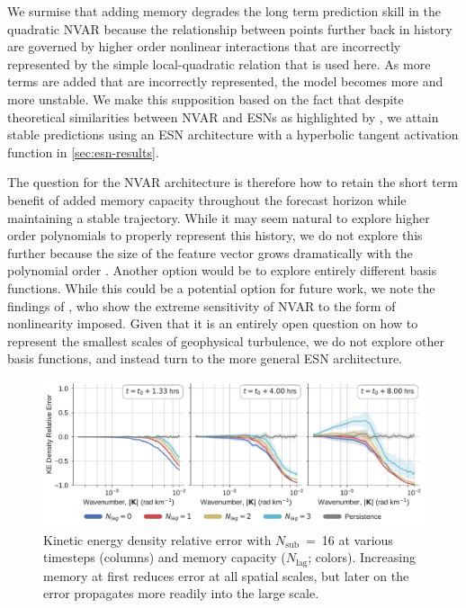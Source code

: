 \documentclass[draft]{agujournal2019}
\newcommand{\maxlag}{N_\text{lag}}
\newcommand{\nsub}{N_\text{sub}}
\newcommand{\nlag}{\maxlag}
\newcommand{\citep}{\cite}
\newcommand{\citet}{\citeA}
\begin{document}
We surmise that adding memory degrades the long term prediction skill in the
quadratic NVAR because
the relationship between points further back in history are governed by higher
order nonlinear interactions that are incorrectly represented by
the simple local-quadratic relation that is used here.
As more terms are added that are incorrectly represented, the model becomes
more and more unstable.
We make this supposition based on the fact that despite
theoretical similarities between NVAR and
ESNs as highlighted by \citet{bollt_explaining_2021}, we attain stable
predictions using an ESN architecture with a hyperbolic tangent activation
function in \cref{sec:esn-results}.

The question for the NVAR architecture
is therefore how to retain the short term benefit of added memory
capacity throughout the forecast horizon while maintaining a stable trajectory.
While it may seem natural to explore higher order polynomials to
properly represent this history, we do not explore this further because the size
of the feature vector grows dramatically with the polynomial order
\citep{chen_next_2022}.
Another option would be to explore entirely different basis functions.
While this could be a potential option for future work, we note the findings of
\citet{zhang_catch-22_2022}, who show the extreme sensitivity of NVAR to the
form of nonlinearity imposed.
Given that it is an entirely open question on how to represent the smallest
scales of geophysical turbulence, we do not explore other basis functions, and
instead turn to the more general ESN architecture.

\begin{figure}
    \centering
    \includegraphics[width=\textwidth]{nvar_ke_relerr_vs_lag.pdf}
    \caption{Kinetic energy density relative error with $\nsub$~=~16 at various
        timesteps (columns) and memory capacity ($\nlag$; colors).
        Increasing memory at first reduces error at all spatial scales, but
        later on the error propagates more readily into the large scale.
    }
    \label{fig:nvar_ke_vs_lag}
\end{figure}
\end{document}
